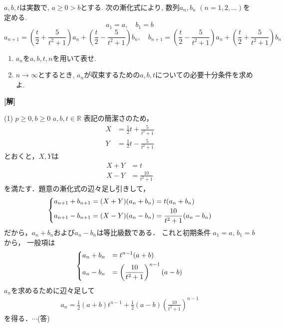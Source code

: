 \documentclass[a4paper,10pt]{ltjsarticle}
\begin{document}
\begin{oframed}
  $a, b, t$は実数で, $a \ge 0 > b$とする.
  次の漸化式により, 数列$a_n, b_n$ $(n=1, 2, \dots)$を定める.
  \[ a_1=a, \quad b_1=b \]
  \[ a_{n+1} = \left(\frac{t}{2} + \frac{5}{t^2+1}\right) a_n + \left(\frac{t}{2} - \frac{5}{t^2+1}\right) b_n, \quad b_{n+1} = \left(\frac{t}{2} - \frac{5}{t^2+1}\right) a_n + \left(\frac{t}{2} + \frac{5}{t^2+1}\right) b_n \]
  \begin{enumerate}
    \item $a_n$を$a, b, t, n$を用いて表せ.
    \item $n \to \infty$とするとき, $a_n$が収束するための$a, b, t$についての必要十分条件を求めよ.
  \end{enumerate}
\end{oframed}
\setlength{\columnseprule}{0.4pt}
\begin{multicols}{2}
  {\bf[解]}

  (1)
  $p \ge 0, b \ge 0$
  $a, b, t \in \mathbb{R}$
  表記の簡潔さのため，
  \begin{align*}
    X & = \frac{1}{2}t + \frac{5}{t^2+1} \\
    Y & = \frac{1}{2}t - \frac{5}{t^2+1}
  \end{align*}
  とおくと，$X,Y$は
  \begin{align*}
    X+Y & =t                \\
    X-Y & =\frac{10}{t^2+1}
  \end{align*}
  を満たす．題意の漸化式の辺々足し引きして，
  \begin{align*}
    \begin{dcases}
      a_{n+1} + b_{n+1} = (X+Y)(a_n+b_n) = t(a_n+b_n) \\
      a_{n+1} - b_{n+1} = (X-Y)(a_n-b_n) = \frac{10}{t^2+1}(a_n-b_n)
    \end{dcases}
  \end{align*}
  だから，$a_n+b_n$および$a_n-b_n$は等比級数である．
  これと初期条件 $a_1=a$, $b_1=b$ から，
  一般項は
  \begin{align*}
    \begin{dcases}
      a_n + b_n & = t^{n-1}(a+b)                             \\
      a_n - b_n & = \left(\frac{10}{t^2+1}\right)^{n-1}(a-b)
    \end{dcases}
  \end{align*}
  $a_n$を求めるために辺々足して
  \begin{align*}
    a_n = \frac{1}{2}(a+b)t^{n-1} + \frac{1}{2}(a-b)\left(\frac{10}{t^2+1}\right)^{n-1}
  \end{align*}
  を得る．$\cdots$(答)


\end{multicols}
\end{document}
